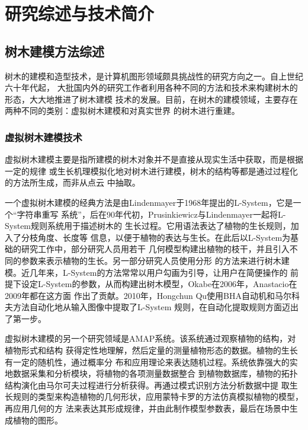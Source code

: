 



\chapter{研究综述与技术简介}
\label{cha:methodsandtechniques}

\section{树木建模方法综述}
\label{sec:treemodelingmethods}
树木的建模和造型技术，是计算机图形领域颇具挑战性的研究方向之一。自上世纪六十年代起，
大批国内外的研究工作者利用各种不同的方法和技术来构建树木的形态，大大地推进了树木建模
技术的发展。目前，在树木的建模领域，主要存在两种不同的类别：虚拟树木建模和对真实世界
的树木进行重建。

\subsection{虚拟树木建模技术}
虚拟树木建模主要是指所建模的树木对象并不是直接从现实生活中获取，而是根据一定的规律
或生长机理模拟化地对树木进行建模，树木的结构等都是通过过程化的方法所生成，而非从点云
中抽取。

一个虚拟树木建模的经典方法是由Lindenmayer于1968年提出的L-System\cite{lsystem}，它是一个“字符串重写
系统”，后在90年代初，Prusinkiewicz与Lindenmayer一起将L-System规则系统用于描述树木的
生长过程\cite{beauty,devmodels}。它用语法表达了植物的生长规则，加入了分枝角度、长度等
信息，以便于植物的表达与生长。在此后以L-System为基础的研究工作中，部分研究人员用若干
几何模型构建出植物的枝干，并且引入不同的参数来表示植物的生长。另一部分研究人员使用分形
的方法来进行树木建模。近几年来，L-System的方法常常以用户勾画为引导，让用户在简便操作的
前提下设定L-System的参数，从而构建出树木模型，Okabe在2006年，Anastacio在2009年\cite{sketch}都在这方面
作出了贡献。2010年，Hongchun Qu使用BHA自动机和马尔科夫方法自动化地从输入图像中提取了L-System
规则，在自动化提取规则方面迈出了第一步。

虚拟树木建模的另一个研究领域是AMAP系统\cite{amap}。该系统通过观察植物的结构，对植物形式和结构
获得定性地理解，然后定量的测量植物形态的数据。植物的生长有一定的随机性，通过概率分
布和应用理论来表达随机过程。系统依靠强大的实地数据采集和分析模块，将植物的各项测量数据整合
到植物数据库，植物的拓扑结构演化由马尔可夫过程进行分析获得。再通过模式识别方法分析数据中提
取生长规则的类型来构造植物的几何形状，应用蒙特卡罗的方法仿真模拟植物的模型，再应用几何的方
法来表达其形成规律，并由此制作模型参数表，最后在场景中生成植物的图形。


